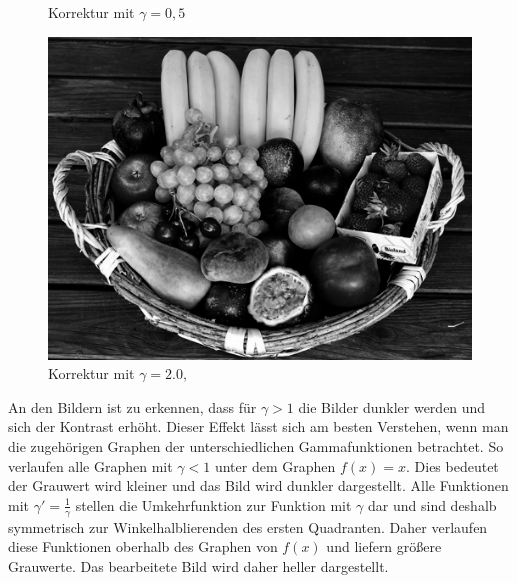 \documentclass[course=erap]{aspdoc}
\begin{document}
\begin{figure}[h]
\begin{minipage}{0.49\linewidth}
        \caption{Korrektur mit $\gamma = 0,5$}
    \end{minipage}
    \centering
    \begin{minipage}{0.49\linewidth}
        \centering
        \includegraphics[scale=1.2]{Images/fruit_basket_gamma_2.png}
        \caption{Korrektur mit $\gamma = 2.0,$}
    \end{minipage}
\end{figure}

\noindent
An den Bildern ist zu erkennen, dass für $\gamma > 1$ die Bilder dunkler werden und sich der Kontrast erhöht. Dieser Effekt lässt sich am besten Verstehen, wenn man die zugehörigen Graphen der unterschiedlichen Gammafunktionen betrachtet. So verlaufen alle Graphen mit $\gamma < 1$  unter dem Graphen $f(x)=x$. Dies bedeutet der Grauwert wird kleiner und das Bild wird dunkler dargestellt. Alle Funktionen mit $\gamma ' = \frac{1}{\gamma}$ stellen die Umkehrfunktion zur Funktion mit $\gamma$ dar und sind deshalb symmetrisch zur Winkelhalblierenden des ersten Quadranten. Daher verlaufen diese Funktionen oberhalb des Graphen von $f(x)$ und liefern größere Grauwerte. Das bearbeitete Bild wird daher heller dargestellt. 
\end{document}
